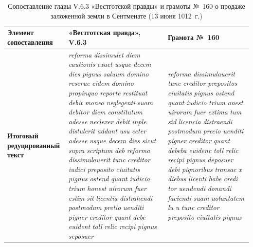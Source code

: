 \begin{center}
\small
\setlength{\tabcolsep}{2pt}
\begin{longtable}{|p{}|p{}|p{}|}
\caption{Сопоставление главы V.6.3 «Вестготской правды» и грамоты №~160 о продаже заложенной земли в Сентменате (13 июня 1012~г.)}\label{tab:ch1-charter-160}\\
\hline
\textbf{Элемент сопоставления} & \textbf{«Вестготская правда», V.6.3} & \textbf{Грамота}\textbf{ №~160} \\ \hline
\textbf{Итоговый редуцированный текст} & \emph{reforma}\emph{ }\emph{dissimulet}\emph{ }\emph{diem}\emph{ }\emph{cautionis}\emph{ }\emph{exact}\emph{ }\emph{usque}\emph{ }\emph{decem}\emph{ }\emph{dies}\emph{ }\emph{pignus}\emph{ }\emph{saluum}\emph{ }\emph{domino}\emph{ }\emph{reserue}\emph{ }\emph{eidem}\emph{ }\emph{domino}\emph{ }\emph{propinquo}\emph{ }\emph{reporte}\emph{ }\emph{restituat}\emph{ }\emph{debit}\emph{ }\emph{monea}\emph{ }\emph{neglegenti}\emph{ }\emph{suam}\emph{ }\emph{debitor}\emph{ }\emph{diem}\emph{ }\emph{constitutum}\emph{ }\emph{adesse}\emph{ }\emph{neclexer}\emph{ }\emph{debit}\emph{ }\emph{inple}\emph{ }\emph{distulerit}\emph{ }\emph{addant}\emph{ }\emph{usu}\emph{ }\emph{ceter}\emph{ }\emph{adesse}\emph{ }\emph{usque}\emph{ }\emph{decem}\emph{ }\emph{dies}\emph{ }\emph{sicut}\emph{ }\emph{supra}\emph{ }\emph{scriptum}\emph{ }\emph{deb}\emph{ }\emph{reforma}\emph{ }\emph{dissimulauerit}\emph{ }\emph{tunc}\emph{ }\emph{creditor}\emph{ }\emph{iudici}\emph{ }\emph{preposito}\emph{ }\emph{ciuitatis}\emph{ }\emph{pignus}\emph{ }\emph{ostend}\emph{ }\emph{quant}\emph{ }\emph{iudicio}\emph{ }\emph{trium}\emph{ }\emph{honest}\emph{ }\emph{uirorum}\emph{ }\emph{fuer}\emph{ }\emph{estim}\emph{ }\emph{sit}\emph{ }\emph{licentia}\emph{ }\emph{distrahendi}\emph{ }\emph{postmodum}\emph{ }\emph{pretio}\emph{ }\emph{uenditi}\emph{ }\emph{pigner}\emph{ }\emph{creditor}\emph{ }\emph{quant}\emph{ }\emph{debe}\emph{ }\emph{euident}\emph{ }\emph{toll}\emph{ }\emph{relic}\emph{ }\emph{recipi}\emph{ }\emph{pignus}\emph{ }\emph{seposuer} & \emph{reforma}\emph{ }\emph{dissimulauerit}\emph{ }\emph{tunc}\emph{ }\emph{creditor}\emph{ }\emph{prepositos}\emph{ }\emph{ciuitatis}\emph{ }\emph{pignus}\emph{ }\emph{ostend}\emph{ }\emph{quant}\emph{ }\emph{iudicio}\emph{ }\emph{trium}\emph{ }\emph{onest}\emph{ }\emph{uirorum}\emph{ }\emph{fuer}\emph{ }\emph{extima}\emph{ }\emph{tum}\emph{ }\emph{sid}\emph{ }\emph{licencia}\emph{ }\emph{distraendi}\emph{ }\emph{postmodum}\emph{ }\emph{precio}\emph{ }\emph{uenditi}\emph{ }\emph{pigner}\emph{ }\emph{creditor}\emph{ }\emph{quant}\emph{ }\emph{debeba}\emph{ }\emph{euidenc}\emph{ }\emph{toll}\emph{ }\emph{relic}\emph{ }\emph{recipi}\emph{ }\emph{pignus}\emph{ }\emph{deposuer}\emph{ }\emph{debi}\emph{ }\emph{pignoribus}\emph{ }\emph{transac}\emph{ x }\emph{diebus}\emph{ }\emph{licenti}\emph{ }\emph{habe}\emph{ }\emph{credi}\emph{ }\emph{tor}\emph{ }\emph{uendendi}\emph{ }\emph{donandi}\emph{ }\emph{faciendi}\emph{ }\emph{suam}\emph{ }\emph{uoluntatem}\emph{ }\emph{lu}\emph{ u }\emph{tunc}\emph{ }\emph{creditor}\emph{ }\emph{preposito}\emph{ }\emph{ciuitatis}\emph{ }\emph{pignus}\emph{ 
\end{longtable}
\end{center}

